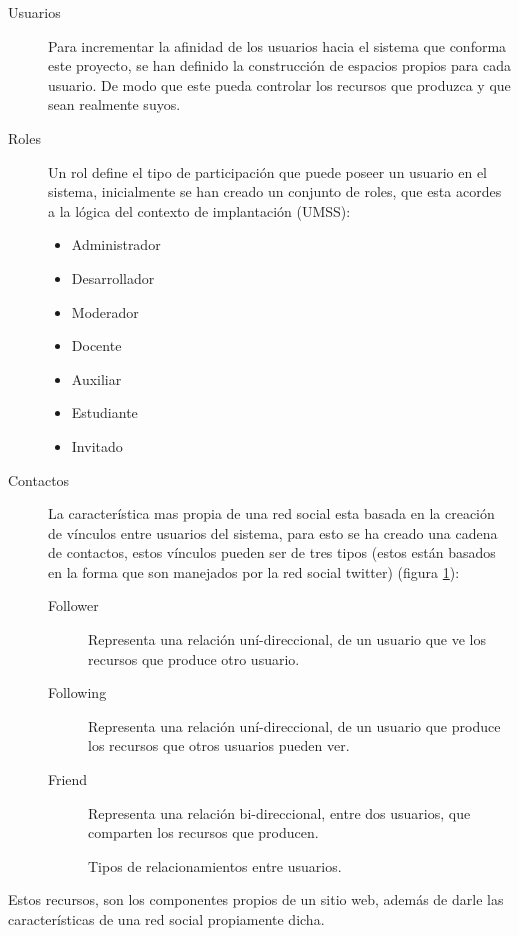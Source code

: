 \begin{description}
\item [Usuarios] Para incrementar la afinidad de los usuarios hacia el sistema
que conforma este proyecto, se han definido la construcción de espacios propios
para cada usuario. De modo que este pueda controlar los recursos que produzca y
que sean realmente suyos.
\item [Roles] Un rol define el tipo de participación que puede poseer un usuario
en el sistema, inicialmente se han creado un conjunto de roles, que esta acordes
a la lógica del contexto de implantación (UMSS):
    \begin{itemize}
    \item Administrador
    \item Desarrollador
    \item Moderador
    \item Docente
    \item Auxiliar
    \item Estudiante
    \item Invitado
    \end{itemize}
\item [Contactos] La característica mas propia de una red social esta basada en
la creación de vínculos entre usuarios del sistema, para esto se ha creado una
cadena de contactos, estos vínculos pueden ser de tres tipos (estos están
basados en la forma que son manejados por la red social twitter) (figura
\ref{contactos}):
    \begin{description}
    \item [Follower] Representa una relación uní-direccional, de un usuario que
    ve los recursos que produce otro usuario.
    \item [Following] Representa una relación uní-direccional, de un usuario que
    produce los recursos que otros usuarios pueden ver.
    \item [Friend] Representa una relación bi-direccional, entre dos usuarios,
    que comparten los recursos que producen.
    \end{description}
    \begin{figure}
    \centering
    
    \caption{Tipos de relacionamientos entre usuarios.}
    \label{contactos}
    \end{figure}
\end{description}

Estos recursos, son los componentes propios de un sitio web, además de darle las
características de una red social propiamente dicha.


